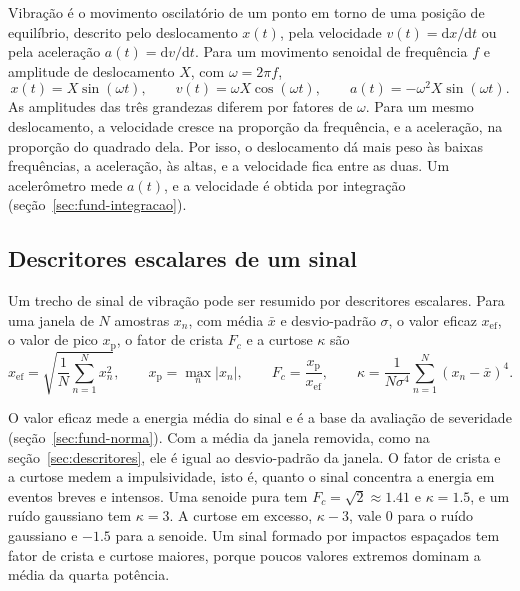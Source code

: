 Vibração é o movimento oscilatório de um ponto em torno de uma posição de equilíbrio, descrito pelo deslocamento $x(t)$, pela velocidade $v(t) = \mathrm{d}x/\mathrm{d}t$ ou pela aceleração $a(t) = \mathrm{d}v/\mathrm{d}t$. Para um movimento senoidal de frequência $f$ e amplitude de deslocamento $X$, com $\omega = 2\pi f$,
\begin{equation}
x(t) = X \sin(\omega t), \qquad v(t) = \omega X \cos(\omega t), \qquad a(t) = -\omega^2 X \sin(\omega t).
\label{eq:fund-senoide}
\end{equation}
As amplitudes das três grandezas diferem por fatores de $\omega$. Para um mesmo deslocamento, a velocidade cresce na proporção da frequência, e a aceleração, na proporção do quadrado dela. Por isso, o deslocamento dá mais peso às baixas frequências, a aceleração, às altas, e a velocidade fica entre as duas. Um acelerômetro mede $a(t)$, e a velocidade é obtida por integração (seção~\ref{sec:fund-integracao}).

\subsection{Descritores escalares de um sinal}\label{sec:fund-descritores}

Um trecho de sinal de vibração pode ser resumido por descritores escalares. Para uma janela de $N$ amostras $x_n$, com média $\bar{x}$ e desvio-padrão $\sigma$, o valor eficaz $x_{\mathrm{ef}}$, o valor de pico $x_{\mathrm{p}}$, o fator de crista $F_c$ e a curtose $\kappa$ são \cite{randall2011livro}
\begin{equation}
x_{\mathrm{ef}} = \sqrt{\frac{1}{N}\sum_{n=1}^{N} x_n^2}, \qquad
x_{\mathrm{p}} = \max_n |x_n|, \qquad
F_c = \frac{x_{\mathrm{p}}}{x_{\mathrm{ef}}}, \qquad
\kappa = \frac{1}{N\sigma^4}\sum_{n=1}^{N} (x_n-\bar{x})^4.
\label{eq:fund-descritores}
\end{equation}

O valor eficaz mede a energia média do sinal e é a base da avaliação de severidade (seção~\ref{sec:fund-norma}). Com a média da janela removida, como na seção~\ref{sec:descritores}, ele é igual ao desvio-padrão da janela. O fator de crista e a curtose medem a impulsividade, isto é, quanto o sinal concentra a energia em eventos breves e intensos. Uma senoide pura tem $F_c = \sqrt{2} \approx \num{1,41}$ e $\kappa = \num{1,5}$, e um ruído gaussiano tem $\kappa = 3$. A curtose em excesso, $\kappa - 3$, vale 0 para o ruído gaussiano e $-\num{1,5}$ para a senoide. Um sinal formado por impactos espaçados tem fator de crista e curtose maiores, porque poucos valores extremos dominam a média da quarta potência.

